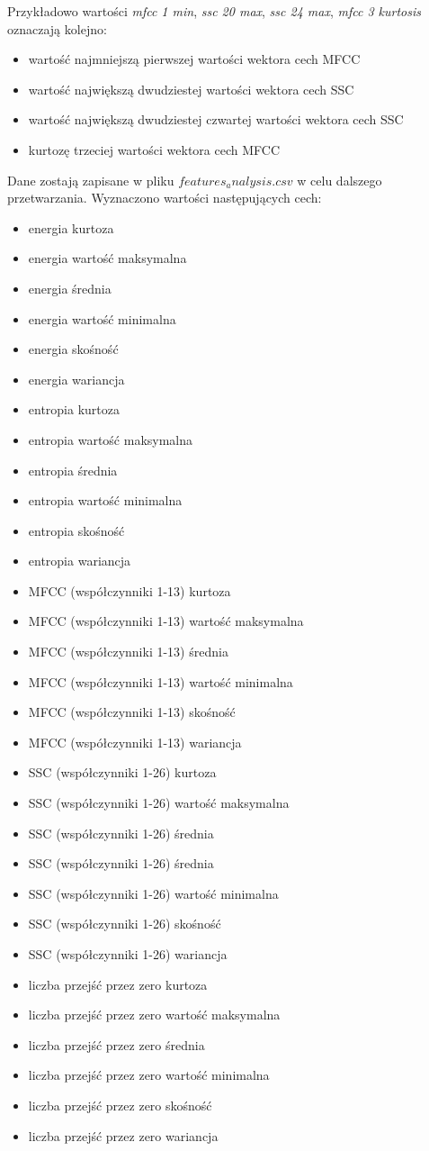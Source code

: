 \documentclass[a4paper,12pt,twoside,openany]{report}
\begin{document}
Przykładowo wartości \textit{mfcc 1 min}, \textit{ssc 20 max}, \textit{ssc 24 max}, \textit{mfcc 3 kurtosis} oznaczają kolejno:
\begin{itemize}
\item wartość najmniejszą pierwszej wartości wektora cech MFCC
\item wartość największą dwudziestej wartości wektora cech SSC
\item wartość największą dwudziestej czwartej wartości wektora cech SSC
\item kurtozę trzeciej wartości wektora cech MFCC
\end{itemize}
Dane zostają zapisane w pliku $features_analysis.csv$ w celu dalszego przetwarzania.
Wyznaczono wartości następujących cech:
\begin{itemize}
\item energia kurtoza
\item energia wartość maksymalna
\item energia średnia
\item energia wartość minimalna
\item energia skośność
\item energia wariancja
\item entropia kurtoza
\item entropia wartość maksymalna
\item entropia średnia
\item entropia wartość minimalna
\item entropia skośność
\item entropia wariancja
\item MFCC (współczynniki 1-13)  kurtoza
\item MFCC (współczynniki 1-13)  wartość maksymalna
\item MFCC (współczynniki 1-13)  średnia
\item MFCC (współczynniki 1-13)  wartość minimalna
\item MFCC (współczynniki 1-13)  skośność
\item MFCC (współczynniki 1-13)  wariancja
\item SSC (współczynniki 1-26)  kurtoza
\item SSC (współczynniki 1-26)  wartość maksymalna
\item SSC (współczynniki 1-26)  średnia
\item SSC (współczynniki 1-26)  średnia
\item SSC (współczynniki 1-26)  wartość minimalna
\item SSC (współczynniki 1-26)  skośność
\item SSC (współczynniki 1-26)  wariancja
\item liczba przejść przez zero kurtoza
\item liczba przejść przez zero wartość maksymalna
\item liczba przejść przez zero średnia
\item liczba przejść przez zero wartość minimalna
\item liczba przejść przez zero skośność
\item liczba przejść przez zero wariancja
\end{itemize}
\end{document}
